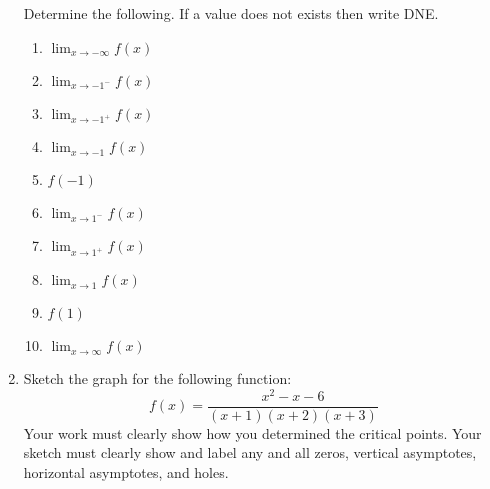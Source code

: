 \documentclass[letterpaper,12pt,fleqn]{article}
\begin{document}
\begin{enumerate}[left=0pt,itemsep=0.5in]
  \bigskip

  Determine the following.  If a value does not exists then write DNE.

  \begin{enumerate}
  \item\(\displaystyle\lim_{x\to-\infty}f(x)\)
  \item\(\displaystyle\lim_{x\to-1^-}f(x)\)
  \item\(\displaystyle\lim_{x\to-1^+}f(x)\)
  \item\(\displaystyle\lim_{x\to-1}f(x)\)
  \item\(\displaystyle f(-1)\)
  \item\(\displaystyle\lim_{x\to1^-}f(x)\)
  \item\(\displaystyle\lim_{x\to1^+}f(x)\)
  \item\(\displaystyle\lim_{x\to1}f(x)\)
  \item\(\displaystyle f(1)\)
  \item\(\displaystyle\lim_{x\to\infty}f(x)\)
  \end{enumerate}

\item Sketch the graph for the following function:
  \[f(x)=\frac{x^2-x-6}{(x+1)(x+2)(x+3)}\]
  Your work must clearly show how you determined the critical points.  Your sketch must clearly show and label any
  and all zeros, vertical asymptotes, horizontal asymptotes, and holes.

\end{enumerate}
\end{document}
